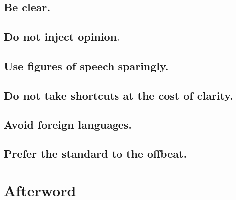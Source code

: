 \documentclass{article}
\numberwithin{equation}{section}
\begin{document}
\subsection{Be clear.}


\subsection{Do not inject opinion.}


\subsection{Use figures of speech sparingly.}


\subsection{Do not take shortcuts at the cost of clarity.}


\subsection{Avoid foreign languages.}


\subsection{Prefer the standard to the offbeat.}


\section{Afterword}


\printbibliography[heading=bibintoc]
	
\end{document}

